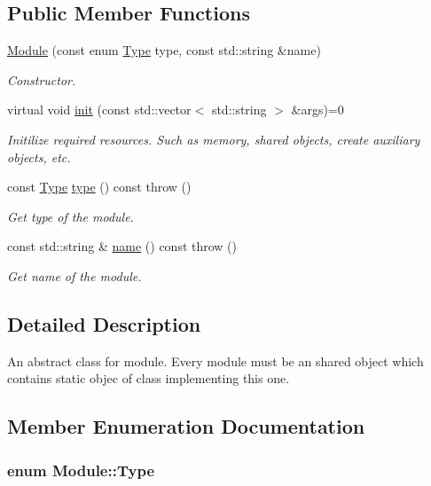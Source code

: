\subsection*{Public Member Functions}
\begin{DoxyCompactItemize}
\item 
\hyperlink{classModule_a1ceed15223d919e56fcbb1ad6273168f}{Module} (const enum \hyperlink{classModule_aa9bdbe3fbb5096298ed3a404fb0d2ccd}{Type} type, const std::string \&name)
\begin{DoxyCompactList}\small\item\em Constructor. \item\end{DoxyCompactList}\item 
virtual void \hyperlink{classModule_a1fb63a59af1664c757f8179dfd68a13d}{init} (const std::vector$<$ std::string $>$ \&args)=0
\begin{DoxyCompactList}\small\item\em Initilize required resources. Such as memory, shared objects, create auxiliary objects, etc. \item\end{DoxyCompactList}\item 
const \hyperlink{classModule_aa9bdbe3fbb5096298ed3a404fb0d2ccd}{Type} \hyperlink{classModule_a605c4ec6c922fa6fb2b2757b082bbc5b}{type} () const   throw ()
\begin{DoxyCompactList}\small\item\em Get type of the module. \item\end{DoxyCompactList}\item 
const std::string \& \hyperlink{classModule_ad6cd28a1d45bba06b1d525ae61b745cf}{name} () const   throw ()
\begin{DoxyCompactList}\small\item\em Get name of the module. \item\end{DoxyCompactList}\end{DoxyCompactItemize}


\subsection{Detailed Description}
An abstract class for module. Every module must be an shared object which contains static objec of class implementing this one. 

\subsection{Member Enumeration Documentation}
\hypertarget{classModule_aa9bdbe3fbb5096298ed3a404fb0d2ccd}{
\subsubsection[{Type}]{\setlength{\rightskip}{0pt plus 5cm}enum {\bf Module::Type}}}
\label{d3/d9c/classModule_aa9bdbe3fbb5096298ed3a404fb0d2ccd}



